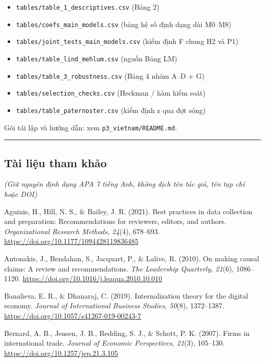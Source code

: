 \documentclass[12pt,a4paper]{article}
\providecommand{\tightlist}{\setlength{\itemsep}{0pt}\setlength{\parskip}{0pt}}
\begin{document}
\begin{itemize}
\tightlist
\item
  \texttt{tables/table\_1\_descriptives.csv} (Bảng 2)
\item
  \texttt{tables/coefs\_main\_models.csv} (bảng hệ số định dạng dài
  M0--M8)
\item
  \texttt{tables/joint\_tests\_main\_models.csv} (kiểm định F chung H2
  và P1)
\item
  \texttt{tables/table\_lind\_mehlum.csv} (nguồn Bảng LM)
\item
  \texttt{tables/table\_3\_robustness.csv} (Bảng 4 nhóm A--D + G)
\item
  \texttt{tables/selection\_checks.csv} (Heckman / hàm kiểm soát)
\item
  \texttt{tables/table\_paternoster.csv} (kiểm định z qua đợt sóng)
\end{itemize}

Gói tái lập và hướng dẫn: xem \texttt{p3\_vietnam/README.md}.

\begin{center}\rule{0.5\linewidth}{0.5pt}\end{center}

\hypertarget{tuxe0i-liux1ec7u-tham-khux1ea3o}{%
\subsection{Tài liệu tham khảo}\label{tuxe0i-liux1ec7u-tham-khux1ea3o}}

\emph{(Giữ nguyên định dạng APA 7 tiếng Anh, không dịch tên tác giả, tên
tạp chí hoặc DOI)}

Aguinis, H., Hill, N. S., \& Bailey, J. R. (2021). Best practices in
data collection and preparation: Recommendations for reviewers, editors,
and authors. \emph{Organizational Research Methods, 24}(4), 678--693.
\url{https://doi.org/10.1177/1094428119836485}

Antonakis, J., Bendahan, S., Jacquart, P., \& Lalive, R. (2010). On
making causal claims: A review and recommendations. \emph{The Leadership
Quarterly, 21}(6), 1086--1120.
\url{https://doi.org/10.1016/j.leaqua.2010.10.010}

Banalieva, E. R., \& Dhanaraj, C. (2019). Internalization theory for the
digital economy. \emph{Journal of International Business Studies,
50}(8), 1372--1387. \url{https://doi.org/10.1057/s41267-019-00243-7}

Bernard, A. B., Jensen, J. B., Redding, S. J., \& Schott, P. K. (2007).
Firms in international trade. \emph{Journal of Economic Perspectives,
21}(3), 105--130. \url{https://doi.org/10.1257/jep.21.3.105}
\end{document}
